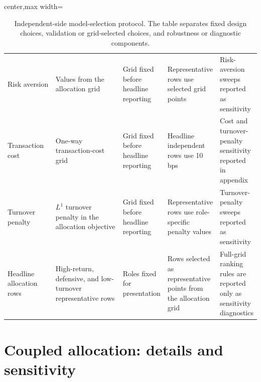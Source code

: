 \begin{table}[H]
\begin{adjustbox}{center,max width=\linewidth}
\begin{tabular}{p{0.20\linewidth}p{0.30\linewidth}p{0.17\linewidth}p{0.18\linewidth}p{0.18\linewidth}}
Risk aversion & Values from the allocation grid & Grid fixed before headline reporting & Representative rows use selected grid points & Risk-aversion sweeps reported as sensitivity \\
Transaction cost & One-way transaction-cost grid & Grid fixed before headline reporting & Headline independent rows use 10 bps & Cost and turnover-penalty sensitivity reported in appendix \\
Turnover penalty & $L^1$ turnover penalty in the allocation objective & Grid fixed before headline reporting & Representative rows use role-specific penalty values & Turnover-penalty sweeps reported as sensitivity \\
Headline allocation rows & High-return, defensive, and low-turnover representative rows & Roles fixed for presentation & Rows selected as representative points from the allocation grid & Full-grid ranking rules are reported only as sensitivity diagnostics \\
\bottomrule
\end{tabular}
\end{adjustbox}
\caption{Independent-side model-selection protocol. The table separates fixed design choices,
validation or grid-selected choices, and robustness or diagnostic components.}
\label{tab:independent-model-selection-protocol}
\end{table}

\FloatBarrier




\section{Coupled allocation: details and sensitivity}
\label{app:alloc-coupled}

